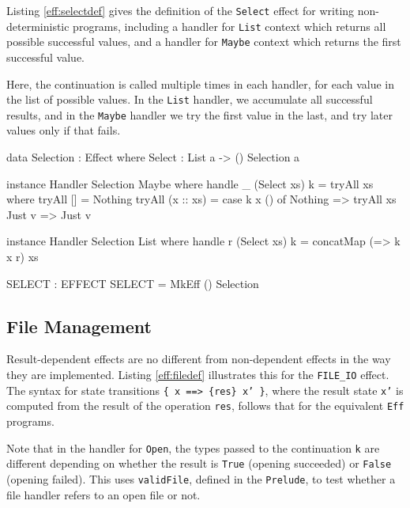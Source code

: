 Listing \ref{eff:selectdef} gives the definition of the \texttt{Select} effect
for writing non-deterministic programs, including a handler for \texttt{List}
context which returns all possible successful values, and a handler for
\texttt{Maybe} context which returns the first successful value.

Here, the continuation is called multiple times in each handler, for each
value in the list of possible values. In the \texttt{List} handler, we
accumulate all successful results, and in the \texttt{Maybe} handler we
try the first value in the last, and try later values only if that fails.

\begin{code}[float=h,frame=single, caption={Non-determinism Effect Definition}, label=eff:selectdef]
data Selection : Effect where
     Select : List a -> { () } Selection a 

instance Handler Selection Maybe where
     handle _ (Select xs) k = tryAll xs where
         tryAll [] = Nothing
         tryAll (x :: xs) = case k x () of
                                 Nothing => tryAll xs
                                 Just v => Just v

instance Handler Selection List where
     handle r (Select xs) k = concatMap (\x => k x r) xs

SELECT : EFFECT
SELECT = MkEff () Selection
\end{code}

\subsection{File Management}

Result-dependent effects are no different from non-dependent effects in
the way they are implemented. Listing \ref{eff:filedef} illustrates this
for the \texttt{FILE\_IO} effect. The syntax for state transitions 
\texttt{\{ x ==> \{res\} x' \}}, where the result state \texttt{x'} is
computed from the result of the operation \texttt{res}, 
follows that for the equivalent
\texttt{Eff} programs.

Note that in the handler for \texttt{Open}, the types passed to the
continuation \texttt{k} are different depending on whether the result
is \texttt{True} (opening succeeded) or \texttt{False} (opening failed).
This uses \texttt{validFile}, defined in the \texttt{Prelude}, to test
whether a file handler refers to an open file or not.

